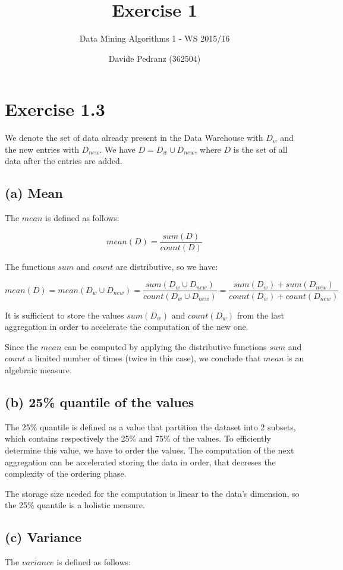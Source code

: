 \documentclass{scrartcl}
\title{Exercise 1}
\subtitle{Data Mining Algorithms 1 - WS 2015/16}
\author{Davide Pedranz (362504)}
\begin{document}
\maketitle

\section*{Exercise 1.3}
We denote the set of data already present in the Data Warehouse with $D_{w}$ and the new entries with $D_{new}$. We have $D = D_{w} \cup D_{new}$, where $D$ is the set of all data after the entries are added.

\subsection*{(a) Mean}
The $mean$ is defined as follows:

$$ mean(D) = \frac{sum(D)}{count(D)} $$

\bigskip
The functions $sum$ and $count$ are distributive, so we have:

$$ mean(D) = mean(D_{w} \cup D_{new}) = \frac{sum(D_{w} \cup D_{new})}{count(D_{w} \cup D_{new})} = \frac{sum(D_{w}) + sum(D_{new})}{count(D_{w}) + count(D_{new})} $$

\bigskip
It is sufficient to store the values $sum(D_{w})$ and $count(D_{w})$ from the last aggregation in order to accelerate the computation of the new one.

Since the $mean$ can be computed by applying the distributive functions $sum$ and $count$ a limited number of times (twice in this case), we conclude that $mean$ is an algebraic measure.

\subsection*{(b) 25\% quantile of the values}
The 25\% quantile is defined as a value that partition the dataset into 2 subsets, which contains respectively the 25\% and 75\% of the values. To efficiently determine this value, we have to order the values. The computation of the next aggregation can be accelerated storing the data in order, that decreses the complexity of the ordering phase.

The storage size needed for the computation is linear to the data's dimension, so the 25\% quantile is a holistic measure.

\subsection*{(c) Variance}
The $variance$ is defined as follows:
\end{document}
